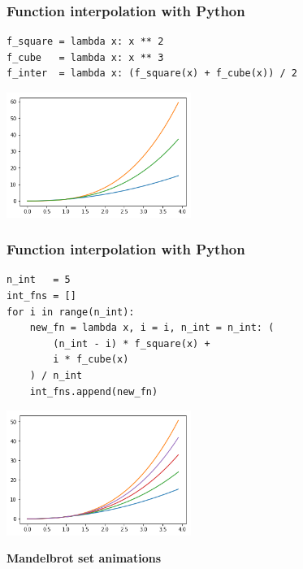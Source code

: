 \documentclass[9pt]{beamer}
\begin{document}
\begin{frame}[fragile]
  \frametitle{Function interpolation with Python}

  \begin{lstlisting}
f_square = lambda x: x ** 2
f_cube   = lambda x: x ** 3
f_inter  = lambda x: (f_square(x) + f_cube(x)) / 2
  \end{lstlisting}

  \begin{center}
    \includegraphics[width = 6cm]{images/single_interpolation.png}
  \end{center}

\end{frame}

\begin{frame}[fragile]
  \frametitle{Function interpolation with Python}

  \begin{lstlisting}
n_int   = 5
int_fns = []
for i in range(n_int):
    new_fn = lambda x, i = i, n_int = n_int: (
        (n_int - i) * f_square(x) +
        i * f_cube(x)
    ) / n_int
    int_fns.append(new_fn)
  \end{lstlisting}

  \begin{center}
    \includegraphics[width = 6cm]{images/interpolations.png}
  \end{center}

\end{frame}

\begin{frame}
  \begin{center}
    {\Huge \bf{Mandelbrot set animations}}
  \end{center}
\end{frame}
\end{document}
